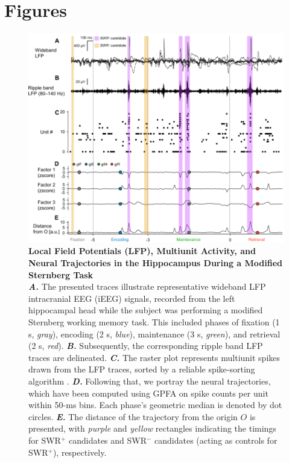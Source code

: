 \documentclass[final,3p,times,twocolumn]{elsarticle}
\begin{document}
\clearpage
\section*{Figures}
\label{figures}
        \clearpage
        \begin{figure}[ht]
        	\centering
            \includegraphics[width=1\textwidth]{./src/figures/.png/Figure_ID_01.png}
        	\caption{\textbf{
Local Field Potentials (LFP), Multiunit Activity, and Neural Trajectories in the Hippocampus During a Modified Sternberg Task
}
\smallskip
\\
\textbf{\textit{A.}} The presented traces illustrate representative wideband LFP intracranial EEG (iEEG) signals, recorded from the left hippocampal head while the subject was performing a modified Sternberg working memory task. This included phases of fixation (1 s, \textit{gray}), encoding (2 s, \textit{blue}), maintenance (3 s, \textit{green}), and retrieval (2 s, \textit{red}). \textbf{\textit{B.}} Subsequently, the corresponding ripple band LFP traces are delineated. \textbf{\textit{C.}} The raster plot represents multiunit spikes drawn from the LFP traces, sorted by a reliable spike-sorting algorithm \cite{niediek_reliable_2016}. \textbf{\textit{D.}} Following that, we portray the neural trajectories, which have been computed using GPFA on spike counts per unit within 50-ms bins. Each phase's geometric median is denoted by dot circles. \textbf{\textit{E.}} The distance of the trajectory from the origin $O$ is presented, with \textit{purple} and \textit{yellow} rectangles indicating the timings for SWR$^+$ candidates and SWR$^-$ candidates (acting as controls for SWR$^+$), respectively.
}
        	\label{fig:01}
        \end{figure}
\end{document}
